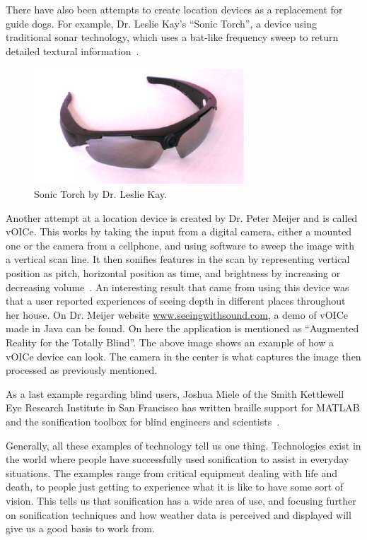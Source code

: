 There have also been attempts to create location devices as a replacement for guide dogs. 
For example, Dr. Leslie Kay’s \enquote{Sonic Torch}, a device using traditional sonar technology, which uses a bat-like frequency sweep to return detailed textural information~\cite{Girvan2005}.

\begin{figure}[!htbp]
    \centering
    \includegraphics[width=0.7\textwidth]{images/Sonification1.png}
    \caption{Sonic Torch by Dr. Leslie Kay.}
    \label{fig:sonification1}
\end{figure}

Another attempt at a location device is created by Dr. Peter Meijer and is called vOICe. 
This works by taking the input from a digital camera, either a mounted one or the camera from a cellphone, and using software to sweep the image with a vertical scan line. 
It then sonifies features in the scan by representing vertical position as pitch, horizontal position as time, and brightness by increasing or decreasing volume~\cite{Girvan2005}. 
An interesting result that came from using this device was that a user reported experiences of seeing depth in different places throughout her house. 
On Dr. Meijer website \url{www.seeingwithsound.com}, a demo of vOICe made in Java can be found. 
On here the application is mentioned as \enquote{Augmented Reality for the Totally Blind}. 
The above image shows an example of how a vOICe device can look. 
The camera in the center is what captures the image then processed as previously mentioned.

As a last example regarding blind users, Joshua Miele of the Smith Kettlewell Eye Research Institute in San Francisco has written braille support for MATLAB and the sonification toolbox for blind engineers and scientists~\cite{Girvan2005}.

Generally, all these examples of technology tell us one thing. 
Technologies exist in the world where people have successfully used sonification to assist in everyday situations. 
The examples range from critical equipment dealing with life and death, to people just getting to experience what it is like to have some sort of vision. 
This tells us that sonification has a wide area of use, and focusing further on sonification techniques and how weather data is perceived and displayed will give us a good basis to work from.

